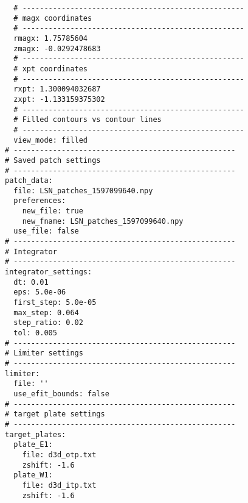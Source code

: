 \begin{lstlisting}
  # ---------------------------------------------------
  # magx coordinates
  # ---------------------------------------------------
  rmagx: 1.75785604
  zmagx: -0.0292478683
  # ---------------------------------------------------
  # xpt coordinates
  # ---------------------------------------------------
  rxpt: 1.300094032687
  zxpt: -1.133159375302
  # ---------------------------------------------------
  # Filled contours vs contour lines
  # ---------------------------------------------------
  view_mode: filled
# ---------------------------------------------------
# Saved patch settings
# ---------------------------------------------------
patch_data:
  file: LSN_patches_1597099640.npy
  preferences:
    new_file: true
    new_fname: LSN_patches_1597099640.npy
  use_file: false
# ---------------------------------------------------
# Integrator
# ---------------------------------------------------
integrator_settings:
  dt: 0.01
  eps: 5.0e-06
  first_step: 5.0e-05
  max_step: 0.064
  step_ratio: 0.02
  tol: 0.005
# ---------------------------------------------------
# Limiter settings
# ---------------------------------------------------
limiter:
  file: ''
  use_efit_bounds: false
# ---------------------------------------------------
# target plate settings
# ---------------------------------------------------
target_plates:
  plate_E1:
    file: d3d_otp.txt
    zshift: -1.6
  plate_W1:
    file: d3d_itp.txt
    zshift: -1.6
\end{lstlisting}
